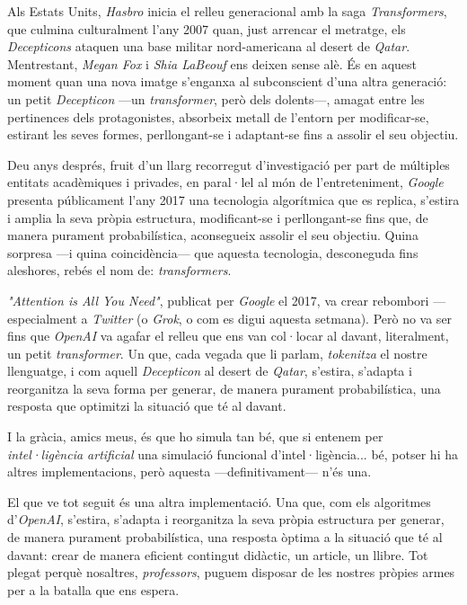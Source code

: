 \documentclass[12pt,a4paper]{article}
\begin{document}
				\medskip
				
				Als Estats Units, \emph{Hasbro} inicia el relleu generacional amb la saga \emph{Transformers}, que culmina culturalment l’any 2007 quan, just arrencar el metratge, els \emph{Decepticons} ataquen una base militar nord-americana al desert de \emph{Qatar}. Mentrestant, \emph{Megan Fox} i \emph{Shia LaBeouf} ens deixen sense alè. És en aquest moment quan una nova imatge s’enganxa al subconscient d’una altra generació: un petit \emph{Decepticon} —un \emph{transformer}, però dels dolents—, amagat entre les pertinences dels protagonistes, absorbeix metall de l’entorn per modificar-se, estirant les seves formes, perllongant-se i adaptant-se fins a assolir el seu objectiu.
				
				\medskip
				
				Deu anys després, fruit d’un llarg recorregut d’investigació per part de múltiples entitats acadèmiques i privades, en paral·lel al món de l’entreteniment, \emph{Google} presenta públicament l’any 2017 una tecnologia algorítmica que es replica, s’estira i amplia la seva pròpia estructura, modificant-se i perllongant-se fins que, de manera purament probabilística, aconsegueix assolir el seu objectiu. Quina sorpresa —i quina coincidència— que aquesta tecnologia, desconeguda fins aleshores, rebés el nom de: \emph{transformers}.
				
				\medskip
				
				\textit{"Attention is All You Need"}, publicat per \emph{Google} el 2017, va crear rebombori —especialment a \emph{Twitter} (o \emph{Grok}, o com es digui aquesta setmana). Però no va ser fins que \emph{OpenAI} va agafar el relleu que ens van col·locar al davant, literalment, un petit \emph{transformer}. Un que, cada vegada que li parlam, \emph{tokenitza} el nostre llenguatge, i com aquell \emph{Decepticon} al desert de \emph{Qatar}, s'estira, s'adapta i reorganitza la seva forma per generar, de manera purament probabilística, una resposta que optimitzi la situació que té al davant.
				
				\medskip
				
				I la gràcia, amics meus, és que ho simula tan bé, que si entenem per \emph{intel·ligència artificial} una simulació funcional d’intel·ligència... bé, potser hi ha altres implementacions, però aquesta —definitivament— n’és una.
				
				\medskip
				
				El que ve tot seguit és una altra implementació. Una que, com els algoritmes d’\emph{OpenAI}, s’estira, s’adapta i reorganitza la seva pròpia estructura per generar, de manera purament probabilística, una resposta òptima a la situació que té al davant: crear de manera eficient contingut didàctic, un article, un llibre. Tot plegat perquè nosaltres, \emph{professors}, puguem disposar de les nostres pròpies armes per a la batalla que ens espera.
				
\end{document}
